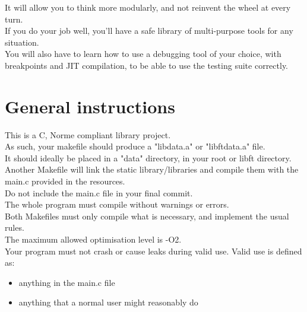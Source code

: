\documentclass{42-en}
\begin{document}
    It will allow you to think more modularly, and not reinvent the wheel at every turn.\\

    If you do your job well, you'll have a safe library of multi-purpose tools for any situation.\\

    You will also have to learn how to use a debugging tool of your choice, with breakpoints
    and JIT compilation, to be able to use the testing suite correctly.\\

\chapter{General instructions}

    This is a C, Norme compliant library project.\\

    As such, your makefile should produce a "libdata.a" or "libftdata.a" file.\\
    It should ideally be placed in a "data" directory, in your root or libft directory.\\
    Another Makefile will link the static library/libraries and compile them
    with the main.c provided in the resources.\\

    Do not include the main.c file in your final commit.\\

    The whole program must compile without warnings or errors.\\

    Both Makefiles must only compile what is necessary, and implement the usual rules.\\

    The maximum allowed optimisation level is -O2.\\

    Your program must not crash or cause leaks during valid use. Valid use is defined as:

    \begin{itemize}\itemsep7pt
        \item anything in the main.c file
        \item anything that a normal user might reasonably do
    \end{itemize}
\end{document}
